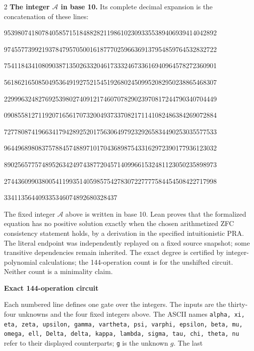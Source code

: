 \documentclass[10pt]{article}
\begin{document}
\begin{multicols}{2}
\textbf{The integer $\mathcal A$ in base 10.}
Its complete decimal expansion is the concatenation of these lines:\par
\begingroup\fontsize{7.7}{8.2}\selectfont{}\par
95398074180784058571518488282119861023093355389406939414042892\par
97455773992193784795705001618777025966369137954859764532832722\par
75411843410809038713502633204617333246733616940964578272360901\par
56186216508504953649192752154519268024509952082950238865468307\par
22999632482769253980274091217460707829023970817244790340704449\par
09085581271192071656170732004937337082171141082486384269072884\par
72778087419663417942892520175630649792329265834490253035577533\par
96449689808375788457488971017043689875433162972390177936123032\par
89025657757489526342497438772045714099661532481123050235898973\par
27443609903800541199351405985754278307227777584454508422717998\par
334113564409335346074892680328437\par
\endgroup
\normalfont\fontsize{7.7}{8.2}\selectfont
The fixed integer $\mathcal A$ above is written in base 10. Lean proves that the formalized equation has no positive solution exactly
when the chosen arithmetized ZFC consistency statement holds, by a derivation
in the specified intuitionistic PRA. The literal endpoint was independently
replayed on a fixed source snapshot; some transitive dependencies remain
inherited. The exact degree is certified by integer-polynomial calculations;
the 144-operation count is for the unshifted circuit. Neither count is a
minimality claim.
\end{multicols}
\clearpage
\begin{center}{\large\bfseries Exact 144-operation circuit}\end{center}
Each numbered line defines one gate over the integers. The inputs are the
thirty-four unknowns and the four fixed integers above. The ASCII names
\texttt{alpha, xi, eta, zeta, upsilon, gamma, vartheta, psi, varphi, epsilon, beta, mu, omega, ell, Delta, delta, kappa, lambda, sigma, tau, chi, theta, nu}
refer to their displayed counterparts; \texttt{g} is the unknown $g$. The last
\end{document}
